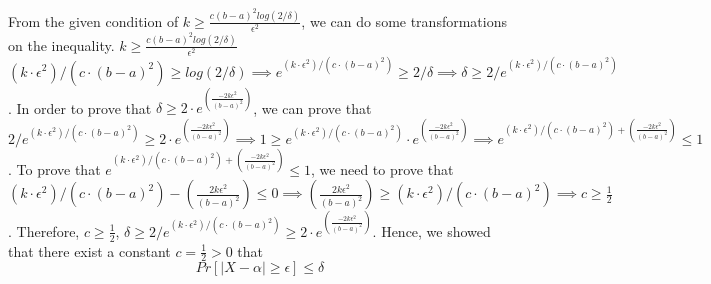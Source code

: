 \documentclass[11pt]{article}
\begin{document}
\begin{solution}
\begin{enumerate}
    
    From the given condition of $k \geq \frac {c(b-a)^2log(2/\delta)}{\epsilon ^2}$, we can do some transformations on the inequality. $k \geq \frac {c(b-a)^2log(2/\delta)}{\epsilon ^2}$ \implies $ (k \cdot \epsilon ^2) /( c\cdot(b-a)^2) \geq log(2/\delta) \implies e^{(k \cdot \epsilon ^2) /( c\cdot(b-a)^2)} \geq 2/\delta \implies \delta \geq 2/e^{(k \cdot \epsilon ^2) /( c\cdot(b-a)^2)}$.
    \newline
    \newline
    In order to prove that $ \delta \geq 2 \cdot e^{(\frac {-2k\epsilon^2}{(b-a)^2})} $, we can prove that $ 2/e^{(k \cdot \epsilon ^2) /( c\cdot(b-a)^2)} \geq 2 \cdot e^{(\frac {-2k\epsilon^2}{(b-a)^2})} \implies 1 \geq e^{(k \cdot \epsilon ^2) /( c\cdot(b-a)^2)} \cdot e^{(\frac {-2k\epsilon^2}{(b-a)^2})}  \implies e^{(k \cdot \epsilon^2) /( c\cdot(b-a)^2) +(\frac {-2k\epsilon^2}{(b-a)^2})} \leq 1$.
    \newline
    \newline
    To prove that $ e^{(k \cdot \epsilon^2) /( c\cdot(b-a)^2) + (\frac {-2k\epsilon^2}{(b-a)^2})} \leq 1$, we need to prove that $ (k \cdot \epsilon^2) /( c\cdot(b-a)^2) - (\frac {2k\epsilon^2}{(b-a)^2}) \leq 0 \implies (\frac {2k\epsilon^2}{(b-a)^2}) \geq (k \cdot \epsilon^2) /( c\cdot(b-a)^2) \implies c \geq \frac {1}{2}$. Therefore, $c \geq \frac{1}{2}$, $\delta \geq 2/e^{(k \cdot \epsilon^2) /( c\cdot(b-a)^2)} \geq 2 \cdot e^{(\frac {-2k\epsilon^2}{(b-a)^2})}$. 
    \newline
    Hence, we showed that there exist a constant $c = \frac{1}{2} > 0$ that
    $$Pr[|X-\alpha| \geq \epsilon] \leq \delta $$
    
    
    
\end{enumerate}

\end{solution}
\end{document}
